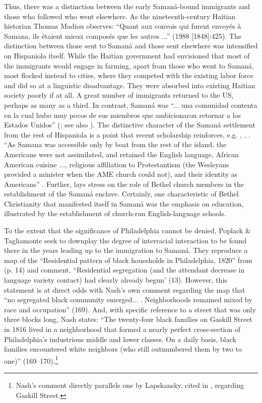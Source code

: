 \documentclass[output=paper,colorlinks,citecolor=brown]{langscibook}
\begin{document}
 
Thus, there was a distinction between the early Samaná-bound immigrants and those who followed who went elsewhere. As the nineteenth-century Haitian historian Thomas Madiou observes: “Quant aux convois qui furent envoyés à Samana, ils étaient mieux composés que les autres ...” (1988 [1848]:425). The distinction between those sent to Samaná and those sent elsewhere was intensified on Hispaniola itself. While the Haitian government had envisioned that most of the immigrants would engage in farming, apart from those who went to Samaná, most flocked instead to cities, where they competed with the existing labor force and did so at a linguistic disadvantage. They were absorbed into existing Haitian society poorly if at all.  A great number of immigrants returned to the US, perhaps as many as a third.  In contrast, Samaná was “...  una comunidad contenta en la cual hubo muy pocos de sus miembros que ambicionaron retornar a los Estados Unidos” (\citealt[107]{PenzoDevers1999}; see also \citealt[230]{Godbout1987}). The distinctive character of the Samaná settlement from the rest of Hispaniola is a point that recent scholarship reinforces, e.g. \citealt{Mann-Hamilton2013, Mann-Hamilton2016}, \citealt{Fanning2015}, \citealt{Mongey2019}. “As Samana was accessible only by boat from the rest of the island, the Americans were not assimilated, and retained the English language, African American cuisine ..., religious affiliation to Protestantism (the Wesleyans provided a minister when the AME church could not), and their identity as Americans” \citep[111--112]{Fanning2015}. Further, \citet{Mann-Hamilton2013, Mann-Hamilton2016} lays stress on the role of Bethel church members in the establishment of the Samaná enclave. Certainly, one characteristic of Bethel Christianity that manifested itself in Samaná was the emphasis on education, illustrated by the establishment of church-run English-language schools. 
 

To the extent that the significance of Philadelphia cannot be denied, Poplack \& Tagliamonte seek to downplay the degree of interracial interaction to be found there in the years leading up to the immigration to Samaná. They reproduce a map of the “Residential pattern of black households in Philadelphia, 1820” from \citet[168]{Nash1988} (p. 14) and comment, “Residential segregation (and the attendant decrease in language variety contact) had clearly already begun’ (13).  However, this statement is at direct odds with Nash’s own comment regarding the map that “no segregated black community emerged... . Neighborhoods remained mixed by race and occupation” (169). And, with specific reference to a street that was only three blocks long, Nash states: “The twenty-four black families on Gaskill Street in 1816 lived in a neighborhood that formed a nearly perfect cross-section of Philadelphia’s industrious middle and lower classes. On a daily basis, black families encountered white neighbors (who still outnumbered them by two to one)” (169--170).\footnote{{Nash’s comment directly parallels one by Lapskansky, cited in , regarding Gaskill Street.}}
 
\end{document}

